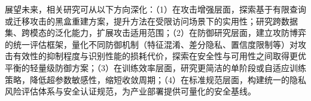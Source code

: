 \begin{conclusions}
展望未来，相关研究可从以下方向深化：（1）在攻击增强层面，探索基于有限查询或迁移攻击的黑盒重建方案，提升方法在受限访问场景下的实用性；研究跨数据集、跨模态的泛化能力，扩展攻击适用范围；（2）在防御研究层面，建立攻防博弈的统一评估框架，量化不同防御机制（特征混淆、差分隐私、置信度限制等）对攻击有效性的抑制程度与识别性能的损耗代价，探索在安全性与可用性之间取得更优平衡的轻量级防御方案；（3）在训练效率层面，研究更简洁的单阶段或自适应训练策略，降低超参数敏感性，缩短收敛周期；（4）在标准规范层面，构建统一的隐私风险评估体系与安全认证规范，为产业部署提供可量化的安全基线。

\end{conclusions}
